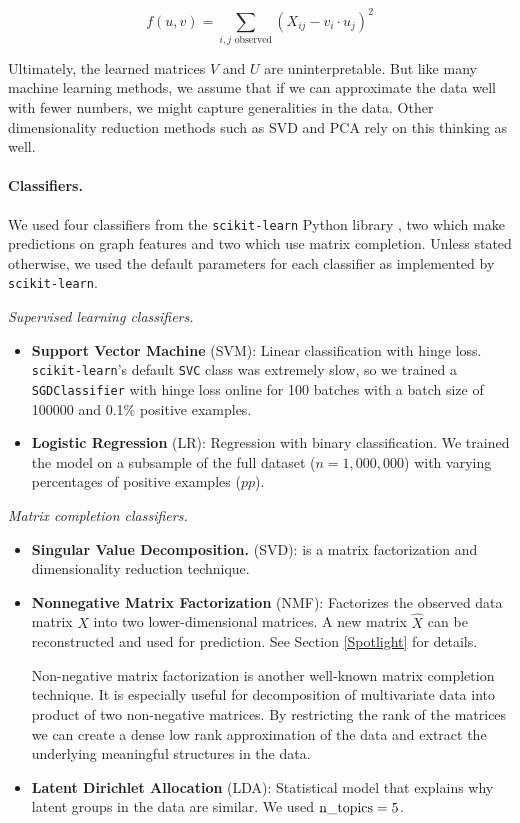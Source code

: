 \documentclass{article} %
\begin{document}
$$
f(u, v) = \sum_{i,j \text{ observed}} (X_{ij} - v_i \cdot u_j)^2
$$

Ultimately, the learned matrices $V$ and $U$ are uninterpretable. But like many machine learning methods, we assume that if we can approximate the data well with fewer numbers, we might capture generalities in the data. Other dimensionality reduction methods such as SVD and PCA rely on this thinking as well.

\paragraph{Classifiers.} We used four classifiers from the \texttt{scikit-learn} Python library \cite{scikit-learn}, two which make predictions on graph features and two which use matrix completion. Unless stated otherwise, we used the default parameters for each classifier as implemented by \texttt{scikit-learn}.

\emph{Supervised learning classifiers.}

\begin{itemize}

\item \textbf{Support Vector Machine} (SVM): Linear classification with hinge loss. \texttt{scikit-learn}'s default \texttt{SVC} class was extremely slow, so we trained a \texttt{SGDClassifier} with hinge loss online for 100 batches with a batch size of 100000 and 0.1\% positive examples.

\item \textbf{Logistic Regression} (LR): Regression with binary classification. We trained the model on a subsample of the full dataset ($n = 1,000,000$) with varying percentages of positive examples ($pp$).

\end{itemize}

\emph{Matrix completion classifiers.}

\begin{itemize}

\item \textbf{Singular Value Decomposition.} (SVD): is a matrix factorization and dimensionality reduction technique.

\item \textbf{Nonnegative Matrix Factorization} (NMF): Factorizes the observed data matrix $X$ into two lower-dimensional matrices. A new matrix $\hat{X}$ can be reconstructed and used for prediction. See Section \ref{Spotlight} for details.

Non-negative matrix factorization is another well-known matrix completion technique. It is especially useful for decomposition of multivariate data into product of two non-negative matrices. By restricting the rank of the matrices we can create a dense low rank approximation of the data and extract the underlying meaningful structures in the data.

\item \textbf{Latent Dirichlet Allocation} (LDA): Statistical model that explains why latent groups in the data are similar. We used $\text{\detokenize{n_topics}}=5$.

\end{itemize}
\end{document}
